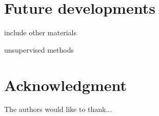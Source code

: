 \section{Future developments}

include other materials \cite{Wills:2015}

unsupervised methods \cite{LWFA:Intech:2010}


\section*{Acknowledgment}


The authors would like to thank...
